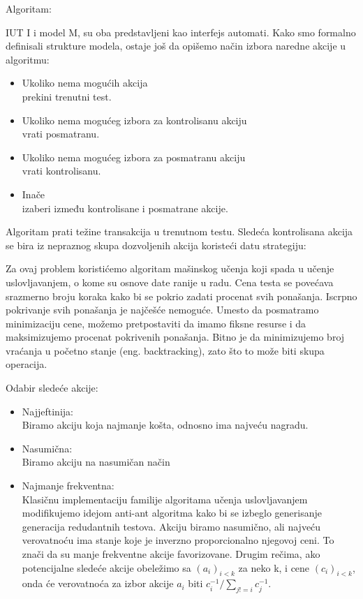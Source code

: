 \documentclass[a4paper]{article}
\theoremstyle{definition}
\begin{document}
{\noindent
Algoritam:

IUT I i model M, su oba predstavljeni kao interfejs automati.
Kako smo formalno definisali strukture modela, ostaje još da opišemo način izbora naredne akcije u algoritmu:
\begin{itemize}
\item Ukoliko nema mogućih akcija\\ prekini trenutni test. 
\item Ukoliko nema mogućeg izbora za kontrolisanu akciju\\ vrati posmatranu.
\item Ukoliko nema mogućeg izbora za posmatranu akciju\\ vrati kontrolisanu.
\item Inače\\ izaberi između kontrolisane i posmatrane akcije.
\end{itemize}

Algoritam prati težine transakcija u trenutnom testu. Sledeća kontrolisana akcija se bira iz nepraznog skupa dozvoljenih akcija koristeći datu strategiju:

Za ovaj problem koristićemo algoritam mašinskog učenja koji spada u učenje uslovljavanjem, o kome su osnove date ranije u radu. 
Cena testa se povećava srazmerno broju koraka kako bi se pokrio zadati procenat svih ponašanja. Iscrpno pokrivanje svih ponašanja je najčešće nemoguće. Umesto da posmatramo minimizaciju cene, možemo pretpostaviti da imamo fiksne resurse i da maksimizujemo procenat pokrivenih ponašanja. Bitno je da minimizujemo broj vraćanja u početno stanje (eng. backtracking), zato što to može biti skupa operacija. %

Odabir sledeće akcije:
\begin{itemize}
\item Najjeftinija: \\
Biramo akciju koja najmanje košta, odnosno ima najveću nagradu.

\item Nasumična: \\
Biramo akciju na nasumičan način

\item Najmanje frekventna: \\
Klasičnu implementaciju familije algoritama učenja uslovljavanjem modifikujemo idejom anti-ant algoritma \cite{antiAnt} kako bi se izbeglo generisanje generacija redudantnih testova.
Akciju biramo nasumično, ali najveću verovatnoću ima stanje koje je inverzno proporcionalno njegovoj ceni. To znači da su manje frekventne akcije favorizovane.
Drugim rečima, ako potencijalne sledeće akcije obeležimo sa $(a_i)_{i < k}$ za neko k, i cene $(c_i)_{i < k}$, onda će verovatnoća za izbor akcije $a_i$ biti $c_i^{-1} / \sum_{j!=i}^{} c_j^{-1}$.
\end{itemize}

}
\end{document}

